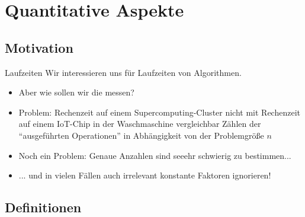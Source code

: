 \section{Quantitative Aspekte}


\subsection{Motivation}
\begin{frame}{Laufzeiten}
	Wir interessieren uns für Laufzeiten von Algorithmen.
	\pause
	\begin{itemize}
		\item Aber wie sollen wir die messen?
		\item Problem: Rechenzeit auf einem Supercomputing-Cluster nicht mit Rechenzeit auf einem IoT-Chip in der Waschmaschine vergleichbar
		\implitem Zählen der \enquote{ausgeführten Operationen} in Abhängigkeit von der Problemgröße $n$
		\item Noch ein Problem: Genaue Anzahlen sind seeehr schwierig zu bestimmen...
		\item[] ... und in vielen Fällen auch irrelevant
		\implitem konstante Faktoren ignorieren!
	\end{itemize}
\end{frame}


\subsection{Definitionen}

